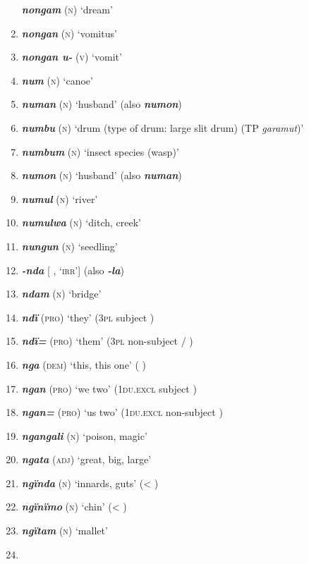 \begin{enumerate}[noitemsep, label={}, align=left, widest=190, labelsep=1ex,leftmargin=*,itemindent=-10pt]
\textbf{\textit{nongam}} (\textsc{n}) ‘dream’ \item
\textbf{\textit{nongan}} (\textsc{n}) ‘vomitus’ \item
\textbf{\textit{nongan u-}} (\textsc{v}) ‘vomit’ \item
\textbf{\textit{num}} (\textsc{n}) ‘canoe’ \item
\textbf{\textit{numan}} (\textsc{n}) ‘husband’ (also \textbf{\textit{numon}}) \item
\textbf{\textit{numbu}} (\textsc{n}) ‘drum (type of drum: large slit drum) (TP \textit{garamut})’ \item
\textbf{\textit{numbum}} (\textsc{n}) ‘insect species (wasp)’ \item
\textbf{\textit{numon}} (\textsc{n}) ‘husband’ (also \textbf{\textit{numan}}) \item
\textbf{\textit{numul}} (\textsc{n}) ‘river’ \item
\textbf{\textit{numulwa}} (\textsc{n}) ‘ditch, creek’ \item
\textbf{\textit{nungun}} (\textsc{n}) ‘seedling’ \item
\textbf{\textit{-nda}} [ , ‘\textsc{irr}’] (also \textbf{\textit{-la}}) \item
\textbf{\textit{ndam} }(\textsc{n}) ‘bridge’ \item
\textbf{\textit{ndï}} (\textsc{pro}) ‘they’ (3\textsc{pl} subject ) \item
\textbf{\textit{ndï=}} (\textsc{pro}) ‘them’ (3\textsc{pl} non-subject  /  ) \item
\textbf{\textit{nga}} (\textsc{dem}) ‘this, this one’ (  ) \item
\textbf{\textit{ngan}} (\textsc{pro}) ‘we two’ (\textsc{1du.excl} subject ) \item
\textbf{\textit{ngan=}} (\textsc{pro}) ‘us two’ (\textsc{1du.excl} non-subject ) \item
\textbf{\textit{ngangali}} (\textsc{n}) ‘poison, magic’ \item
\textbf{\textit{ngata}} (\textsc{adj}) ‘great, big, large’ \item
\textbf{\textit{ngïnda}} (\textsc{n}) ‘innards, guts’ (< ) \item
\textbf{\textit{ngïnïmo}} (\textsc{n}) ‘chin’ (< ) \item
\textbf{\textit{ngïtam}} (\textsc{n}) ‘mallet’ \item

\end{enumerate}
